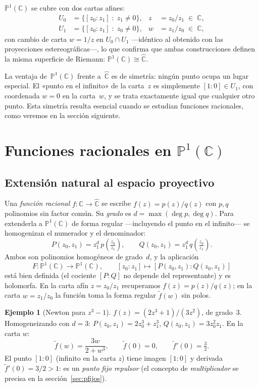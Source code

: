 \documentclass[11pt,a4paper]{article}
\theoremstyle{plain}
\theoremstyle{definition}
\newtheorem{ejemplo}[teorema]{Ejemplo}
\theoremstyle{remark}
\newcommand{\C}{\mathbb{C}}
\newcommand{\Puno}{\mathbb{P}^1(\mathbb{C})}
\begin{document}
$\Puno$ se cubre con dos cartas afines:
\begin{align*}
  U_0 &= \{[z_0:z_1]\;:\;z_1\neq 0\},
  &z &= z_0/z_1\;\in\;\C,\\
  U_1 &= \{[z_0:z_1]\;:\;z_0\neq 0\},
  &w &= z_1/z_0\;\in\;\C,
\end{align*}
con cambio de carta $w=1/z$ en $U_0\cap U_1$ —idéntico al obtenido
con las proyecciones estereográficas—, lo que confirma que ambas
construcciones definen la misma superficie de Riemann: $\Puno\cong\hat{\C}$.

La ventaja de~$\Puno$ frente a~$\hat{\C}$ es de simetría: ningún punto
ocupa un lugar especial.
El «punto en el infinito» de la carta~$z$ es simplemente $[1:0]\in U_1$,
con coordenada $w=0$ en la carta~$w$, y se trata exactamente igual que
cualquier otro punto.
Esta simetría resulta esencial cuando se estudian funciones racionales,
como veremos en la sección siguiente.

\section{Funciones racionales en \texorpdfstring{$\Puno$}{P1(C)}}
\label{sec:racionales}

\subsection{Extensión natural al espacio proyectivo}

Una \emph{función racional} $f:\C\to\hat{\C}$ se escribe
$f(z)=p(z)/q(z)$ con $p,q$ polinomios sin factor común.
Su \emph{grado} es $d=\max(\deg p,\deg q)$.
Para extenderla a $\Puno$ de forma regular —incluyendo el punto en el
infinito— se homogenizan el numerador y el denominador:
\[
  P(z_0,z_1) = z_1^d\,p\!\left(\tfrac{z_0}{z_1}\right),\qquad
  Q(z_0,z_1) = z_1^d\,q\!\left(\tfrac{z_0}{z_1}\right).
\]
Ambos son polinomios homogéneos de grado~$d$, y la aplicación
\[
  F:\Puno\longrightarrow\Puno,\qquad
  [z_0:z_1]\longmapsto [P(z_0,z_1):Q(z_0,z_1)]
\]
está bien definida (el cociente $[P:\!Q]$ no depende del representante)
y es holomorfa.
En la carta afín $z=z_0/z_1$ recuperamos $f(z)=p(z)/q(z)$; en la carta
$w=z_1/z_0$ la función toma la forma regular $\tilde{f}(w)$ sin polos.

\begin{ejemplo}[Newton para $z^3-1$]
$f(z)=(2z^3+1)/(3z^2)$, de grado~$3$.
Homogeneizando con $d=3$:
$P(z_0,z_1)=2z_0^3+z_1^3$,\; $Q(z_0,z_1)=3z_0^2 z_1$.
En la carta $w$:
\[
   \tilde{f}(w) = \frac{3w}{2+w^3},\qquad\tilde{f}(0)=0,\qquad
   \tilde{f}'(0)=\tfrac{3}{2}.
\]
El punto $[1:0]$ (infinito en la carta $z$) tiene imagen $[1:0]$ y
derivada~$\tilde{f}'(0)=3/2>1$: es un \emph{punto fijo repulsor}
(el concepto de \emph{multiplicador} se precisa en la sección~\ref{sec:pfijos}).
\end{ejemplo}
\end{document}
